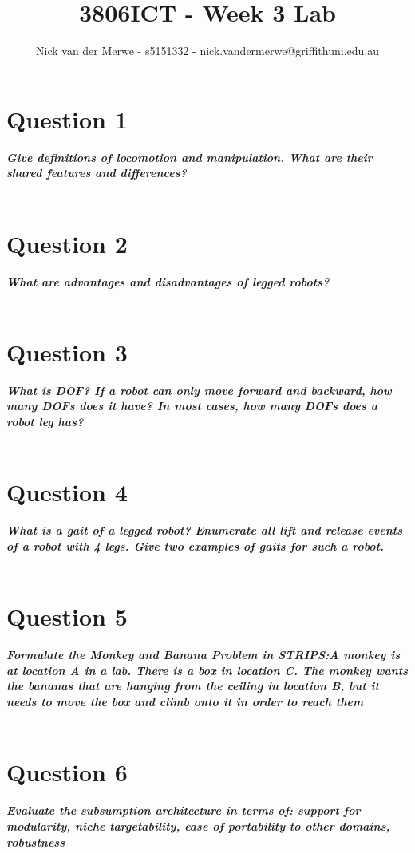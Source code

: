 \documentclass{article}
\title{3806ICT - Week 3 Lab}
\author{Nick van der Merwe - s5151332 - nick.vandermerwe@griffithuni.edu.au}
\newcommand\tab[1][1cm]{\hspace*{#1}}
\begin{document}
\maketitle

\section*{Question 1}
\textbf{\textit{
    \tab Give  definitions  of  locomotion  and  manipulation.  What  are  their shared features and differences?  
}} \\ \\
\section*{Question 2}
\textbf{\textit{
    \tab What are advantages and disadvantages of legged robots?
}} \\ \\
\section*{Question 3}
\textbf{\textit{
    \tab What is DOF? If a robot can only move forward and backward, how many DOFs does it have? In most cases, how many DOFs does a robot leg has?
}} \\ \\
\section*{Question 4}
\textbf{\textit{
    \tab What is a gait of a legged robot? Enumerate all lift and release events of a robot with 4 legs. Give two examples of gaits for such a robot.
}} \\ \\
\section*{Question 5}
\textbf{\textit{
    \tab Formulate the Monkey and Banana Problem in STRIPS:A monkey is at location A in a lab. There is a box in location C. The monkey wants the bananas that are hanging from the ceiling in location B, but it needs to move the box and climb onto it in order to reach them
}} \\ \\
\section*{Question 6}
\textbf{\textit{
    \tab Evaluate  the  subsumption  architecture  in  terms  of:  support  for modularity, niche targetability, ease of portability to other domains, robustness
}} \\ \\
\end{document}
